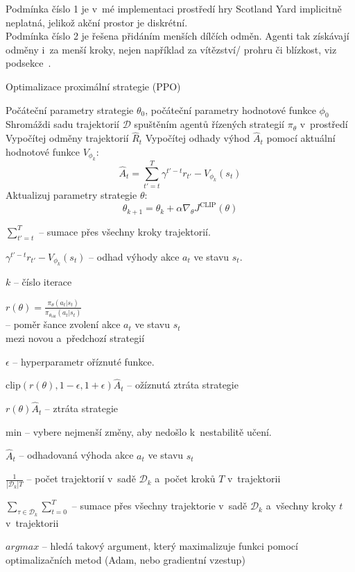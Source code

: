 Podmínka číslo 1 je v~mé implementaci prostředí hry Scotland Yard implicitně neplatná, jelikož akční prostor je diskrétní.\\
Podmínka číslo 2 je řešena přidáním menších dílčích odměn.
Agenti tak získávají odměny i~za menší kroky, nejen například za vítězství/ prohru či blízkost, viz podsekce~.\\

\pagebreak

\begin{algorithm}
  \caption{Optimalizace proximální strategie (PPO)}
  \begin{algorithmic}[1]
  \State Počáteční parametry strategie $\theta_0$, počáteční parametry hodnotové funkce $\phi_0$
      \State Shromáždi sadu trajektorií $\mathcal{D}$ spuštěním agentů řízených strategií $\pi_\theta$ v~prostředí
      \State Vypočítej odměny trajektorií $\hat{R}_t$
      \State Vypočítej odhady výhod $\hat{A}_t$ pomocí aktuální hodnotové funkce $V_{\phi_k}$:
      \[
      \hat{A}_t = \sum_{t'=t}^T \gamma^{t'-t} r_{t'} - V_{\phi_k}(s_t)
      \]
      \State Aktualizuj parametry strategie $\theta$:
      \[
        \theta_{k+1} = \theta_k + \alpha \nabla_\theta J^{\text{CLIP}}(\theta)
      \]
    \EndFor
  \end{algorithmic}
  \end{algorithm}
  \begin{myitemize}
    \item $\sum_{t'=t}^T$ -- sumace přes všechny kroky trajektorií.
    \item $\gamma^{t'-t} r_{t'} - V_{\phi_k}(s_t)$ -- odhad výhody akce $a_t$ ve stavu $s_t$.
    \item $k$ -- číslo iterace
    \item $r(\theta) = \frac{\pi_\theta(a_t|s_t)}{\pi_{\theta_{\text{old}}}(a_t|s_t)}$\\ -- poměr šance zvolení akce $a_t$ ve stavu $s_t$ \\ mezi novou a~předchozí strategií
    \item $\epsilon$ -- hyperparametr oříznuté funkce.
    \item $\text{clip}(r(\theta), 1-\epsilon, 1+\epsilon) \hat{A}_t$ -- ožíznutá ztráta strategie
    \item $r(\theta) \hat{A}_t$ -- ztráta strategie
    \item min --  vybere nejmenší změny, aby nedošlo k~nestabilitě učení.
    \item $\hat{A}_t$ -- odhadovaná výhoda akce $a_t$ ve stavu $s_t$
    \item $\frac{1}{\left|\mathcal{D}_k\right|T}$ -- počet trajektorií v~sadě $\mathcal{D}_k$ a~počet kroků $T$ v~trajektorii
    \item $\displaystyle\sum_{\tau \in \mathcal{D}_k} \sum_{t=0}^T$ -- sumace přes všechny trajektorie v~sadě $\mathcal{D}_k$ a~všechny kroky $t$ v~trajektorii
    \item $argmax$ -- hledá takový argument, který maximalizuje funkci pomocí optimalizačních metod (Adam, nebo gradientní vzestup)
\end{myitemize}



